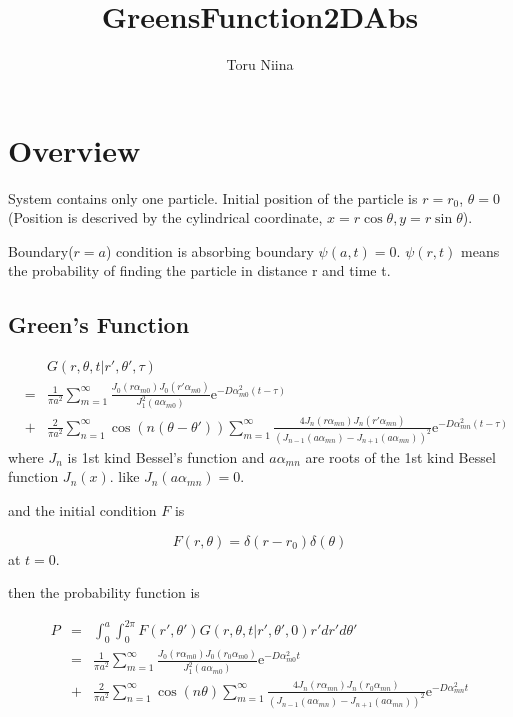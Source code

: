 \documentclass{article}
\begin{document}
\title{GreensFunction2DAbs}
\author{Toru Niina}
\maketitle

\section{Overview}

System contains only one particle. Initial position of the particle is $r=r_0$, $\theta = 0$
(Position is descrived by the cylindrical coordinate,
$x = r\cos\theta, y = r\sin\theta$).

Boundary($r=a$) condition is absorbing boundary $\psi(a,t) = 0$.
$\psi(r, t)$ means the probability of finding the particle in distance r and time t.

\subsection{Green's Function}

\begin{eqnarray}
    & & G(r, \theta, t | r', \theta', \tau) \nonumber\\
    &=& \frac{1}{\pi a^2}\sum^{\infty}_{m=1}
        \frac{J_0(r\alpha_{m0})J_0(r'\alpha_{m0})}{J^2_1(a\alpha_{m0})}
        \mathrm{e}^{-D\alpha^2_{m0} (t-\tau)} \nonumber \\
    &+& \frac{2}{\pi a^2}\sum^{\infty}_{n=1}\cos(n(\theta - \theta'))
        \sum^{\infty}_{m=1}
        \frac{4J_n(r\alpha_{mn})J_n(r'\alpha_{mn})}
             {(J_{n-1}(a\alpha_{mn})-J_{n+1}(a\alpha_{mn}))^2}
        \mathrm{e}^{-D\alpha^2_{mn} (t-\tau)} \nonumber
\end{eqnarray}
where $J_n$ is 1st kind Bessel's function and
$a\alpha_{mn}$ are roots of the 1st kind Bessel function $J_n(x)$. like
$J_n(a\alpha_{mn}) = 0$. 

and the initial condition $F$ is

\begin{equation}
    F(r, \theta) = \delta(r - r_0)\delta(\theta)
\end{equation}
at $t=0$.

then the probability function is

\begin{eqnarray}
    P &=& \int^a_0 \int^{2\pi}_0 F(r', \theta')
                                 G(r, \theta, t | r', \theta', 0)
                                 r'dr'd\theta' \nonumber \\
      &=& \frac{1}{\pi a^2}\sum^{\infty}_{m=1}
                                 \frac{J_0(r\alpha_{m0})J_0(r_0\alpha_{m0})}
                                      {J^2_1(a\alpha_{m0})}
          \mathrm{e}^{-D\alpha^2_{m0} t} \nonumber \\
      &+& \frac{2}{\pi a^2}\sum^{\infty}_{n=1}\cos(n\theta)
          \sum^{\infty}_{m=1}
          \frac{4J_n(r\alpha_{mn})J_n(r_0\alpha_{mn})}
               {(J_{n-1}(a\alpha_{mn})-J_{n+1}(a\alpha_{mn}))^2}
          \mathrm{e}^{-D\alpha^2_{mn} t}
\end{eqnarray}
\end{document}
